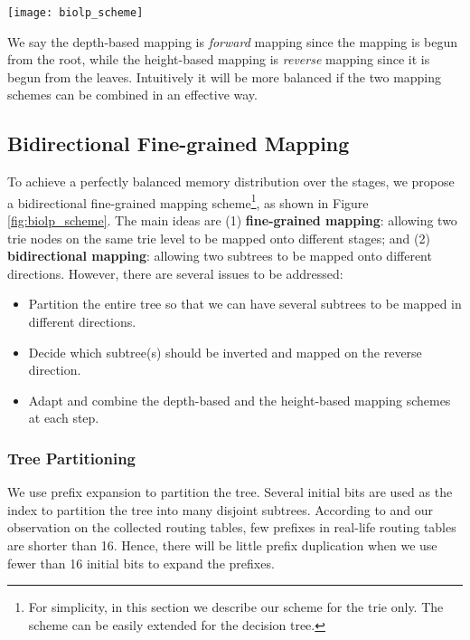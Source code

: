 \documentclass{sigcomm-alternate}
\begin{document}
\begin{figure*}[htb]
\centering
\texttt{[image: biolp\_scheme]}
\caption{Bidirectional fine-grained mapping for the trie in Figure \ref{fig:trie}.}
\label{fig:biolp_scheme}
\end{figure*}

We say the depth-based mapping is \textit{forward} mapping since the mapping is begun from the root, while the height-based mapping is \textit{reverse} mapping since it is begun from the leaves. Intuitively it will be more balanced if the two mapping schemes can be combined in an effective way.




\subsection{Bidirectional Fine-grained Mapping}

To achieve a perfectly balanced memory distribution over the stages, we propose a bidirectional fine-grained mapping scheme\footnote{For simplicity, in this section we describe our scheme for the trie only. The scheme can be easily extended for the decision tree.}, as shown in Figure \ref{fig:biolp_scheme}. The main ideas are (1) \textbf{fine-grained mapping}: allowing two trie nodes on the same trie level to be mapped onto different stages; and (2) \textbf{bidirectional mapping}: allowing two subtrees to be mapped onto different directions. However, there are several issues to be addressed:

\begin{itemize}
	\item Partition the entire tree so that we can have several subtrees to be mapped in different directions.
	\item Decide which subtree(s) should be inverted and mapped on the reverse direction.
	\item Adapt and combine the depth-based and the height-based mapping schemes at each step.
\end{itemize}

\subsubsection{Tree Partitioning}
\label{sec:partition}

We use prefix expansion \cite{tocs99:srinivasan} to partition the tree. Several initial bits are used as the index to partition the tree into many disjoint subtrees. According to \cite{sigcomm01:baboescu} and our observation on the collected routing tables, few prefixes in real-life routing tables are shorter than 16. Hence, there will be little prefix duplication when we use fewer than 16 initial bits to expand the prefixes.
\end{document}
